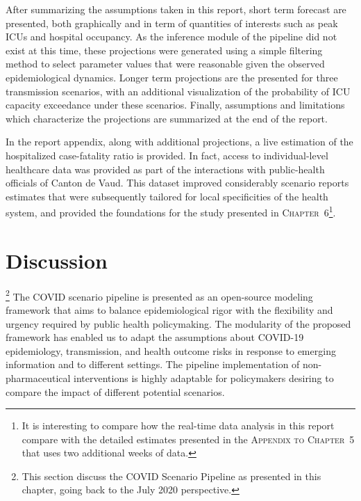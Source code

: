 After summarizing the assumptions taken in this report, short term forecast are presented, both graphically and in term of quantities of interests such as peak ICUs and hospital occupancy. As the inference module of the pipeline did not exist at this time, these projections were generated using a simple filtering method to select parameter values that were reasonable given the observed epidemiological dynamics.  Longer term projections are the presented for three transmission scenarios, with an additional visualization of the probability of ICU capacity exceedance under these scenarios. Finally, assumptions and limitations which characterize the projections are summarized at the end of the report. 

In the report appendix, along with additional projections, a live estimation of the hospitalized case-fatality ratio is provided. In fact, access to individual-level healthcare data was provided as part of the interactions with public-health officials of Canton de Vaud.  This dataset improved considerably scenario reports estimates that were subsequently tailored for local specificities of the health system, and provided the foundations for the study presented in \textsc{Chapter~6}\footnote{It is interesting to compare how the real-time data analysis in this report compare with the detailed estimates presented in the \textsc{Appendix to Chapter~5} that uses two additional weeks of data.}.


 


\section{Discussion}\footnote{This section discuss the COVID Scenario Pipeline as presented in this chapter, \ie going back to the July 2020 perspective.}
The COVID scenario pipeline is presented as an open-source modeling framework that aims to balance epidemiological rigor with the flexibility and urgency required by public health policymaking. The modularity of the proposed framework has enabled us to adapt the assumptions about COVID-19 epidemiology, transmission, and health outcome risks in response to emerging information and to different settings. The pipeline implementation of non-pharmaceutical interventions is highly adaptable for policymakers desiring to compare the impact of different potential scenarios.

